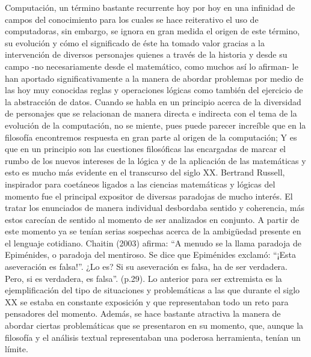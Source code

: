 \documentclass{article}
\begin{document}
Computación, un término bastante recurrente hoy por hoy en una infinidad de campos del conocimiento para los cuales se hace reiterativo el uso de computadoras, sin embargo, se ignora en gran medida el origen de este término, su evolución y cómo el significado de éste ha tomado valor gracias a la intervención de diversos personajes quienes a través de la historia y desde su campo -no necesariamente desde el matemático, como muchos así lo afirman- le han aportado significativamente a la manera de abordar problemas por medio de las hoy muy conocidas reglas y operaciones lógicas como también del ejercicio de la abstracción de datos.  
Cuando se habla en un principio acerca de la diversidad de personajes que se relacionan de manera directa e indirecta con el tema de la evolución de la computación, no se miente, pues puede parecer increíble que en la filosofía encontremos respuesta en gran parte al origen de la computación; Y es que en un principio son las cuestiones filosóficas las encargadas de marcar el rumbo de los nuevos intereses de la lógica y de la aplicación de las matemáticas y esto es mucho más evidente en el transcurso del siglo XX. Bertrand Russell, inspirador para coetáneos ligados a las ciencias matemáticas y lógicas del momento fue el principal expositor de diversas paradojas de mucho interés. El tratar los enunciados de manera individual desbordaba sentido y coherencia, más estos carecían de sentido al momento de ser analizados en conjunto. A partir de este momento ya se tenían serias sospechas acerca de la ambigüedad presente en el lenguaje cotidiano. Chaitin (2003) afirma: “A menudo se la llama paradoja de Epiménides, o paradoja del mentiroso. Se dice que Epiménides exclamó: “¡Esta aseveración es falsa!”. ¿Lo es? Si su aseveración es falsa, ha de ser verdadera. Pero, si es verdadera, es falsa”. (p.29). Lo anterior para ser extremista es la ejemplificación del tipo de situaciones y problemáticas a las que durante el siglo XX se estaba en constante exposición y que representaban todo un reto para pensadores del momento. Además, se hace bastante atractiva la manera de abordar ciertas problemáticas que se presentaron en su momento, que, aunque la filosofía y el análisis textual representaban una poderosa herramienta, tenían un límite. 
\end{document}
